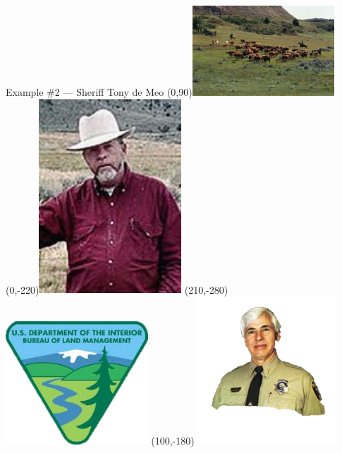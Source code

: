 \begin{frame}{Example \#2 --- Sheriff Tony de Meo}
    \Put(0,90){\includegraphics[height=0.5\textheight,keepaspectratio=true,width=0.4\textwidth]{img/de-meo-ranch.png}}
    \Put(0,-220){\includegraphics[height=0.5\textheight,keepaspectratio=true,width=0.4\textwidth]{img/de-meo-person.png}}
    \Put(210,-280){\includegraphics[height=0.5\textheight,keepaspectratio=true,width=0.4\textwidth]{img/blm.png}}
    \Put(100,-180){\includegraphics[height=0.5\textheight,keepaspectratio=true,width=0.4\textwidth]{img/tony-de-meo.png}}
\end{frame}

